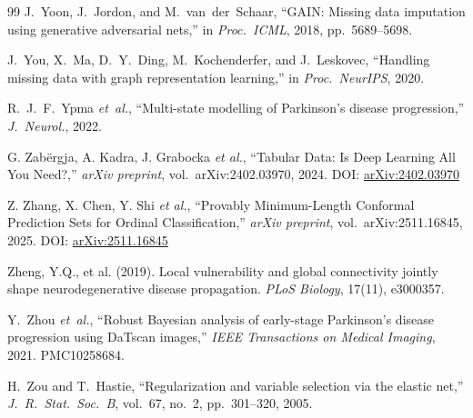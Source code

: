 \begin{thebibliography}{99}
J.~Yoon, J.~Jordon, and M.~van~der~Schaar, ``GAIN: Missing data imputation using generative adversarial nets,'' in \textit{Proc.\ ICML}, 2018, pp.~5689--5698.

J.~You, X.~Ma, D.~Y.~Ding, M.~Kochenderfer, and J.~Leskovec, ``Handling missing data with graph representation learning,'' in \textit{Proc.\ NeurIPS}, 2020.

R.~J.~F.~Ypma \textit{et~al.}, ``Multi-state modelling of Parkinson's disease progression,'' \textit{J.\ Neurol.}, 2022.



G. Zabërgja, A. Kadra, J. Grabocka \textit{et al.},
``Tabular Data: Is Deep Learning All You Need?,''
\textit{arXiv preprint}, vol.~arXiv:2402.03970, 2024. DOI: \href{https://arxiv.org/abs/2402.03970}{arXiv:2402.03970}

Z. Zhang, X. Chen, Y. Shi \textit{et al.},
``Provably Minimum-Length Conformal Prediction Sets for Ordinal Classification,''
\textit{arXiv preprint}, vol.~arXiv:2511.16845, 2025. DOI: \href{https://arxiv.org/abs/2511.16845}{arXiv:2511.16845}

Zheng, Y.Q., et al. (2019).
\newblock Local vulnerability and global connectivity jointly shape neurodegenerative disease propagation.
\newblock \emph{PLoS Biology}, 17(11), e3000357.

Y.~Zhou \textit{et~al.}, ``Robust Bayesian analysis of early-stage Parkinson's disease progression using DaTscan images,'' \textit{IEEE Transactions on Medical Imaging}, 2021. PMC10258684.


H.~Zou and T.~Hastie, ``Regularization and variable selection via the elastic net,'' \textit{J.\ R.\ Stat.\ Soc.\ B}, vol.~67, no.~2, pp.~301--320, 2005.

\end{thebibliography}
